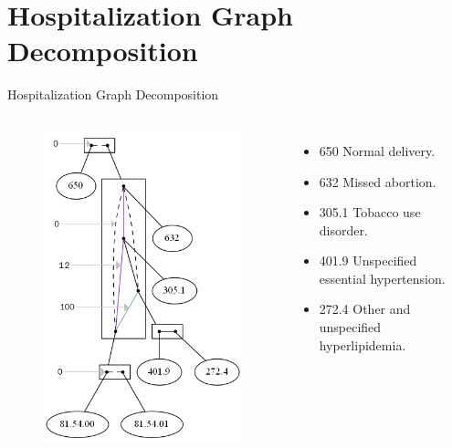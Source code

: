 \documentclass[11pt]{beamer}
\begin{document}
\section{Hospitalization Graph Decomposition}
	\begin{frame}{Hospitalization Graph Decomposition}
		\begin{columns}
            \begin{figure}
                \centering
                \includegraphics[width=0.9 \textwidth]{img/datahsp_withoutV_100_exp_values_conected_1.png}
            \end{figure}
         
            \begin{itemize}
                \item 650 Normal delivery.
                \item 632 Missed abortion.
                \item 305.1 Tobacco use disorder.
                \item 401.9 Unspecified essential hypertension.
                \item 272.4 Other and unspecified hyperlipidemia.
            \end{itemize}
        \end{columns}
	\end{frame}
\end{document}
